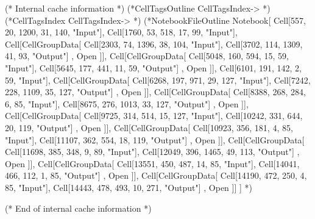 (* Internal cache information *)
(*CellTagsOutline
CellTagsIndex->{}
*)
(*CellTagsIndex
CellTagsIndex->{}
*)
(*NotebookFileOutline
Notebook[{
Cell[557, 20, 1200, 31, 140, "Input"],
Cell[1760, 53, 518, 17, 99, "Input"],
Cell[CellGroupData[{
Cell[2303, 74, 1396, 38, 104, "Input"],
Cell[3702, 114, 1309, 41, 93, "Output"]
}, Open  ]],
Cell[CellGroupData[{
Cell[5048, 160, 594, 15, 59, "Input"],
Cell[5645, 177, 441, 11, 59, "Output"]
}, Open  ]],
Cell[6101, 191, 142, 2, 59, "Input"],
Cell[CellGroupData[{
Cell[6268, 197, 971, 29, 127, "Input"],
Cell[7242, 228, 1109, 35, 127, "Output"]
}, Open  ]],
Cell[CellGroupData[{
Cell[8388, 268, 284, 6, 85, "Input"],
Cell[8675, 276, 1013, 33, 127, "Output"]
}, Open  ]],
Cell[CellGroupData[{
Cell[9725, 314, 514, 15, 127, "Input"],
Cell[10242, 331, 644, 20, 119, "Output"]
}, Open  ]],
Cell[CellGroupData[{
Cell[10923, 356, 181, 4, 85, "Input"],
Cell[11107, 362, 554, 18, 119, "Output"]
}, Open  ]],
Cell[CellGroupData[{
Cell[11698, 385, 348, 9, 89, "Input"],
Cell[12049, 396, 1465, 49, 113, "Output"]
}, Open  ]],
Cell[CellGroupData[{
Cell[13551, 450, 487, 14, 85, "Input"],
Cell[14041, 466, 112, 1, 85, "Output"]
}, Open  ]],
Cell[CellGroupData[{
Cell[14190, 472, 250, 4, 85, "Input"],
Cell[14443, 478, 493, 10, 271, "Output"]
}, Open  ]]
}
]
*)

(* End of internal cache information *)

